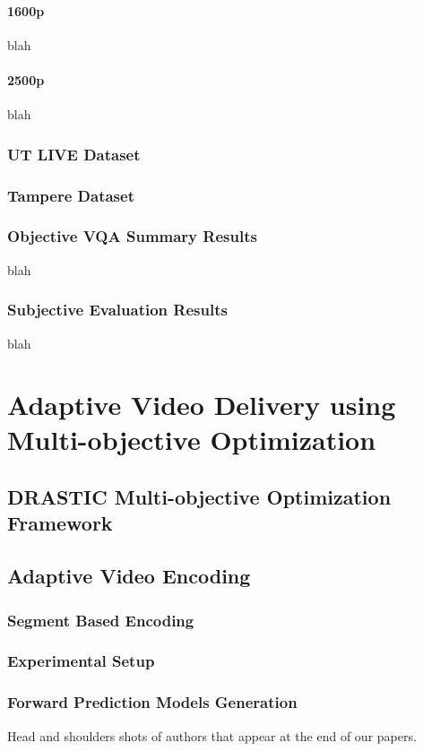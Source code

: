 \documentclass{ieeeaccess}
\begin{document}
\paragraph{1600p}
blah
\paragraph{2500p}
blah
\subsubsection{UT LIVE Dataset}
\subsubsection{Tampere Dataset}
\subsubsection{Objective VQA Summary Results}
blah
\subsubsection{Subjective Evaluation Results}
blah

\section{Adaptive Video Delivery using Multi-objective Optimization}
\label{sec:adaptive video delivery}

\subsection{DRASTIC Multi-objective Optimization Framework}

\subsection{Adaptive Video Encoding}

\subsubsection{Segment Based Encoding}

\subsubsection{Experimental Setup}

\subsubsection{Forward Prediction Models Generation}
{Head and shoulders shots of authors that appear at the end of our papers. }
\end{document}
